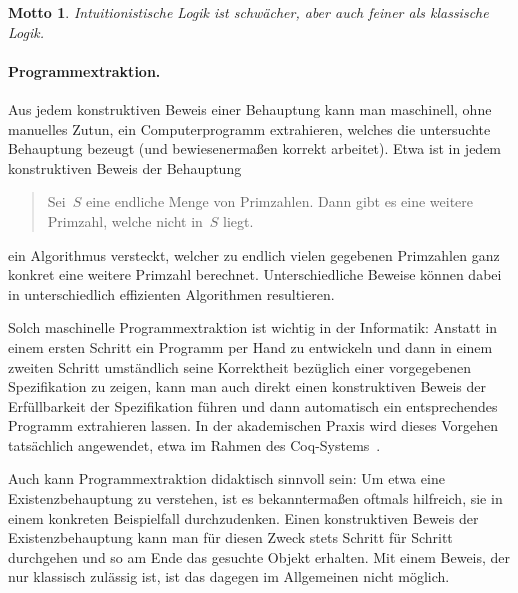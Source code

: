 \documentclass[a4paper,ngerman,12pt]{scrartcl}
\theoremstyle{definition}
\theoremstyle{plain}
\newtheorem{motto}[defn]{Motto}
\theoremstyle{remark}
\renewcommand{\_}{\mathpunct{.}\,}
\newcommand{\?}{\,{:}\,}
\begin{document}
\begin{motto}Intuitionistische Logik ist schwächer, aber auch feiner als
klassische Logik.\end{motto}


\paragraph{Programmextraktion.} Aus jedem konstruktiven Beweis einer Behauptung
kann man maschinell, ohne manuelles Zutun, ein Computerprogramm extrahieren,
welches die untersuchte Behauptung bezeugt (und bewiesenermaßen korrekt
arbeitet). Etwa ist in jedem konstruktiven Beweis der Behauptung
\begin{quote}Sei~$S$ eine endliche Menge von Primzahlen. Dann gibt es eine
weitere Primzahl, welche nicht in~$S$ liegt.\end{quote}
ein Algorithmus versteckt, welcher zu endlich vielen gegebenen Primzahlen
ganz konkret eine weitere Primzahl berechnet. Unterschiedliche Beweise können
dabei in unterschiedlich effizienten Algorithmen resultieren.

Solch maschinelle
Programmextraktion ist wichtig in der Informatik: Anstatt in einem ersten
Schritt ein Programm per Hand zu entwickeln und dann in einem zweiten
Schritt umständlich seine Korrektheit bezüglich einer vorgegebenen
Spezifikation zu zeigen, kann man auch direkt einen konstruktiven Beweis der
Erfüllbarkeit der Spezifikation führen und dann automatisch ein entsprechendes
Programm extrahieren lassen. In der akademischen Praxis wird dieses Vorgehen
tatsächlich angewendet, etwa im Rahmen des Coq-Systems~\cite{coq:manual}.

Auch kann Programmextraktion didaktisch sinnvoll sein: Um etwa eine
Existenzbehauptung zu verstehen, ist es bekanntermaßen oftmals hilfreich, sie in einem konkreten
Beispielfall durchzudenken. Einen konstruktiven Beweis der Existenzbehauptung
kann man für diesen Zweck stets Schritt für Schritt durchgehen und so am Ende das gesuchte
Objekt erhalten. Mit einem Beweis, der nur klassisch zulässig ist, ist das
dagegen im Allgemeinen nicht möglich.
\end{document}
